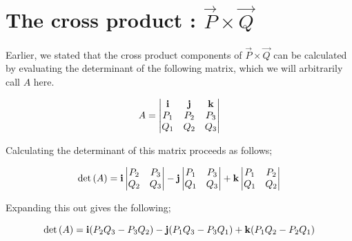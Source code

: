 \chapter{The cross product : \(\vec{P}\times\vec{Q}\)}

Earlier, we stated that the cross product components of \(\vec{P}\times\vec{Q}\) can be calculated by evaluating the
determinant of the following matrix, which we will arbitrarily call \(A\) here.

\begin{equation*}
    A = \begin{vmatrix}
        \bm{\mathrm{i}} & \bm{\mathrm{j}} & \bm{\mathrm{k}}  \\
        P_1      & P_2      & P_3       \\
        Q_1      & Q_2      & Q_3
        \end{vmatrix}
\end{equation*}
\vspace{0.0\baselineskip}

Calculating the determinant of this matrix proceeds as follows;

\begin{equation*}
    \det{(A)} = \bm{\mathrm{i}}
    \begin{vmatrix}
        P_2        & P_3  \\
        Q_2        & Q_3
    \end{vmatrix}
    -
    \bm{\mathrm{j}}
    \begin{vmatrix}
        P_1        & P_3  \\
        Q_1        & Q_3
    \end{vmatrix}
    +
    \bm{\mathrm{k}}
    \begin{vmatrix}
        P_1        & P_2  \\
        Q_1        & Q_2
    \end{vmatrix}
\end{equation*}
\vspace{0.0\baselineskip}

Expanding this out gives the following;

\begin{equation*}
    \det{(A)} = \bm{\mathrm{i}} (P_2Q_3 - P_3Q_2) - \bm{\mathrm{j}} (P_1Q_3 - P_3Q_1) + \bm{\mathrm{k}}(P_1Q_2 - P_2Q_1)
\end{equation*}

%


